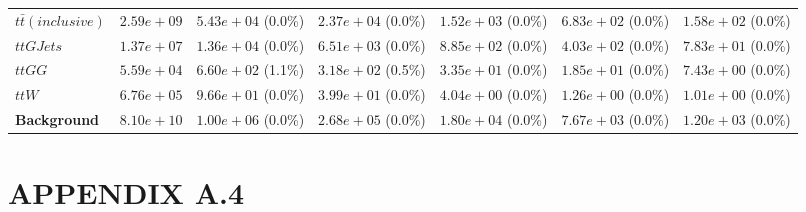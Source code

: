 \begin{landscape}
\begin{table}[h!]
\begin{tabular}{ |l|c|c|c|c|c|c| }
                    $t\bar{t} (inclusive)$ &  $2.59e+09$ &   $5.43e+04$ (0.0\%) &  $2.37e+04$ (0.0\%) &  $1.52e+03$ (0.0\%) &    $6.83e+02$ (0.0\%) &    $1.58e+02$ (0.0\%) \\
                                 $ttGJets$ &  $1.37e+07$ &   $1.36e+04$ (0.0\%) &  $6.51e+03$ (0.0\%) &  $8.85e+02$ (0.0\%) &    $4.03e+02$ (0.0\%) &    $7.83e+01$ (0.0\%) \\
                                    $ttGG$ &  $5.59e+04$ &   $6.60e+02$ (1.1\%) &  $3.18e+02$ (0.5\%) &  $3.35e+01$ (0.0\%) &    $1.85e+01$ (0.0\%) &    $7.43e+00$ (0.0\%) \\
                                     $ttW$ &  $6.76e+05$ &   $9.66e+01$ (0.0\%) &  $3.99e+01$ (0.0\%) &  $4.04e+00$ (0.0\%) &    $1.26e+00$ (0.0\%) &    $1.01e+00$ (0.0\%) \\
                       \textbf{Background} &  $8.10e+10$ &   $1.00e+06$ (0.0\%) &  $2.68e+05$ (0.0\%) &  $1.80e+04$ (0.0\%) &    $7.67e+03$ (0.0\%) &    $1.20e+03$ (0.0\%) \\
    \hline
\end{tabular}
\label{semileptonic_cutflow}
\end{table}
\end{landscape}


\section*{APPENDIX A.4}


